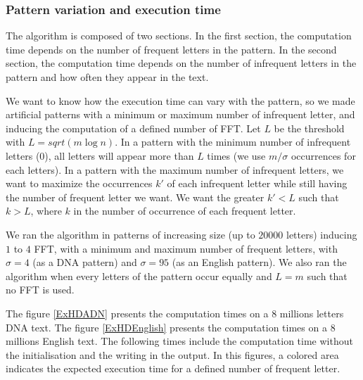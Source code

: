 \documentclass[preprint,12pt]{elsarticle}
\begin{document}
\subsubsection*{Pattern variation and execution time}

The algorithm is composed of two sections.
In the first section, the computation time depends
on the number of frequent letters in the pattern.
In the second section, the computation time depends on the number
of infrequent letters in the pattern and how often they appear in the text.

We want to know how the execution time can vary with the pattern,
so %
we made artificial patterns
with a minimum or maximum number of infrequent letter,
and inducing the computation of a defined number of FFT.
Let $L$ be the threshold with $L = sqrt(m \log n)$.
In a pattern with the minimum number of infrequent letters ($0$),
all letters will appear more than $L$ times
(we use $m/\sigma$ occurrences for each letters).
In a pattern with the maximum number of infrequent letters,
we want to maximize the occurrences $k'$ of each infrequent letter
while still having the number of frequent letter we want.
We want the greater $k'<L$ such that $k > L$,
where $k$ in the number of occurrence of each frequent letter.

We ran the algorithm in patterns of increasing size (up to $20 000$ letters) inducing $1$ to $4$ FFT,
with a minimum and maximum number of frequent letters, with $\sigma = 4$ (as a DNA pattern)
and $\sigma = 95$ (as an English pattern).
We also ran the algorithm when every letters of the pattern occur equally and $L=m$ such that no FFT is used.

The figure \ref{ExHDADN} presents the computation times on a $8$ millions letters DNA text.
The figure \ref{ExHDEnglish} presents the computation times on a $8$ millions English text.
The following times include the computation time without the initialisation and the writing in the output.
In this figures, a colored area indicates the expected execution time for a defined number of frequent letter.
\end{document}
